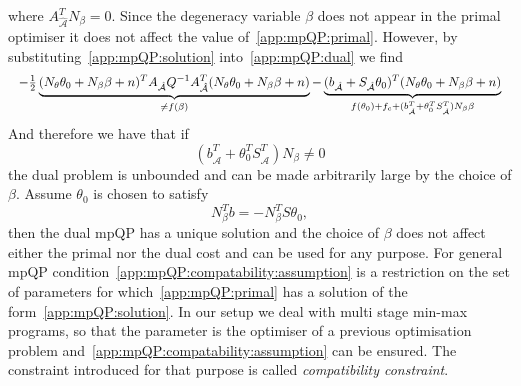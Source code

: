 %
where $A^T_{\hat{\mathcal A}} N_\beta=0$. Since the degeneracy variable $\beta$ does not appear in the
primal optimiser it does not affect the value of~\eqref{app:mpQP:primal}.
%
However, by substituting~\eqref{app:mpQP:solution} into~\eqref{app:mpQP:dual}
we find
%
\begin{equation}\Resize{
	-\frac{1}{2}\underbrace{(N_\theta \theta_0 + N_\beta \beta + n)^T A_{\hat{\mathcal A}} Q^{-1}A^T_{\hat{\mathcal A}} 
	(N_\theta \theta_0 + N_\beta \beta + n)}_{\neq f(\beta)} -\underbrace{( 
	b_{\hat{\mathcal A}} + S_{\hat{\mathcal A}}\theta_0)^T(N_\theta \theta_0 + N_\beta \beta + 
	n)}_{f(\theta_0)+f_c + (b^T_{\hat{\mathcal A}}+\theta^T_0S^T_{\hat{\mathcal A}})N_\beta 
	\beta}
	}
\end{equation}
%
And therefore we have that if
%
\begin{equation}
	(b^T_{\hat{\mathcal A}}+\theta^T_0 S^T_{\hat{\mathcal A}})N_\beta \neq 0
\end{equation}
%
the dual problem is unbounded and can be made arbitrarily large by the choice of $\beta$. Assume
$\theta_0$ is chosen to satisfy 
%
\begin{equation}\label{app:mpQP:compatability:assumption}
	N_\beta^Tb = -N_\beta^TS\theta_0,
\end{equation} 
%
then the dual mpQP has a unique solution
and the choice of $\beta$ does not affect either the primal nor the dual cost and can be used for
any purpose. For general mpQP condition~\eqref{app:mpQP:compatability:assumption} is a restriction on the set
of parameters for which~\eqref{app:mpQP:primal} has a solution of the form~\eqref{app:mpQP:solution}.
%
In our setup we deal with multi stage min-max programs, so that the parameter is the optimiser 
of a previous optimisation problem and~\eqref{app:mpQP:compatability:assumption} can be ensured. 
%
The constraint introduced for that purpose is called \emph{compatibility constraint}. 



